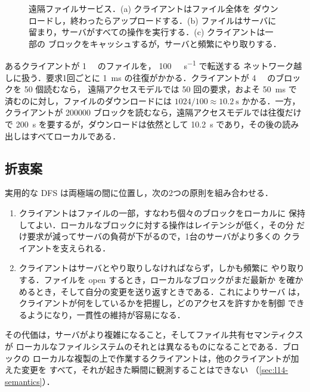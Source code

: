 \documentclass[../main.tex]{subfiles}
\begin{document}
\begin{figure}[htbp]
  \centering
  
  \caption{遠隔ファイルサービス．(a) クライアントはファイル全体を
    ダウンロードし，終わったらアップロードする．(b) ファイルはサーバに
    留まり，サーバがすべての操作を実行する．(c) クライアントは一部の
    ブロックをキャッシュするが，サーバと頻繁にやり取りする．}
  \label{fig:l14-remote}
\end{figure}

\begin{example}
  \label{ex:l14-download}
  あるクライアントが \SI{1}{\gibi\byte} のファイルを，
  \SI[per-mode=symbol]{100}{\mebi\byte\per\second} で転送する
  ネットワーク越しに扱う．要求1回ごとに
  \SI{1}{\milli\second} の往復がかかる．クライアントが
  \SI{4}{\kibi\byte} のブロックを 50 個読むなら，
  遠隔アクセスモデルでは 50 回の要求，およそ \SI{50}{\milli\second} で
  済むのに対し，ファイルのダウンロードには
  $1024/100 \approx \SI{10.2}{\second}$ かかる．一方，クライアントが
  \num{200000} ブロックを読むなら，遠隔アクセスモデルでは往復だけで
  \SI{200}{\second} を要するが，ダウンロードは依然として
  \SI{10.2}{\second} であり，その後の読み出しはすべてローカルである．
\end{example}

\subsection{折衷案}

実用的な DFS は両極端の間に位置し，次の2つの原則を組み合わせる．
\begin{enumerate}
  \item クライアントはファイルの一部，すなわち個々のブロックをローカルに
    保持してよい．ローカルなブロックに対する操作はレイテンシが低く，その分
    だけ要求が減ってサーバの負荷が下がるので，1台のサーバがより多くの
    クライアントを支えられる．
  \item クライアントはサーバとやり取りしなければならず，しかも頻繁に
    やり取りする．ファイルを open するとき，ローカルなブロックがまだ最新か
    を確かめるとき，そして自分の変更を送り返すときである．これによりサーバ
    は，クライアントが何をしているかを把握し，どのアクセスを許すかを制御
    できるようになり，一貫性の維持が容易になる．
\end{enumerate}
その代価は，サーバがより複雑になること，そしてファイル共有セマンティクスが
ローカルなファイルシステムのそれとは異なるものになることである．ブロックの
ローカルな複製の上で作業するクライアントは，他のクライアントが加えた変更を
すべて，それが起きた瞬間に観測することはできない
（\cref{sec:l14-semantics}）．
\end{document}
